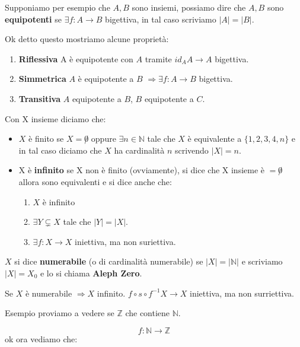 \documentclass{article}
\theoremstyle{definition}
\begin{document}
Supponiamo per esempio che $A,B$ sono insiemi, possiamo dire che $A,B$ sono \textbf{equipotenti} se $\exists f:A \rightarrow B$ bigettiva, in tal caso scriviamo $|A| = |B|$. \par

Ok detto questo mostriamo alcune proprietà:
\begin{enumerate}
        \item \textbf{Riflessiva} A è equipotente con $A$ tramite $id_A A \rightarrow A$ bigettiva.
        \item \textbf{Simmetrica} $A$ è equipotente a $B$ $\Rightarrow \exists f:A \rightarrow B$ bigettiva. 
        \item \textbf{Transitiva} $A$ equipotente a $B$, $B$ equipotente a $C$.	
\end{enumerate}

Con X insieme diciamo che:
\begin{itemize}
        \item $X$ è finito se $X = \not 0$ oppure $\exists n \in \mathbb{N}$ tale che $X$ è equivalente a $\{1,2,3,4,n\}$ e in tal caso diciamo che $X$ ha cardinalità $n$ scrivendo $|X| = n$.
        \item X è \textbf{infinito} se X non è finito (ovviamente), si dice che X insieme è $= \not 0$ allora sono equivalenti e si dice anche che:
        \begin{enumerate}
                \item$X$ è infinito
                \item $\exists Y \subsetneq X$ tale che $|Y|=|X|$.
                \item $\exists f:X \to X$ iniettiva, ma non suriettiva.
        \end{enumerate}
\end{itemize}

$X$ si dice \textbf{numerabile} (o di cardinalità numerabile) se $|X| = |\mathbb{N}|$ e scriviamo $|X| = X_0$ e lo si chiama \textbf{Aleph Zero}. \par
Se $X$ è numerabile $\Rightarrow X$ infinito. \newline
$f \circ s \circ f^{-1} X \rightarrow X$ iniettiva, ma non surriettiva.

Esempio proviamo a vedere se $\mathbb{Z}$ che contiene $\mathbb{N}$. \par
\begin{equation}
        f : \mathbb{N} \rightarrow \mathbb{Z}
\end{equation}
ok ora vediamo che: \newline
\end{document}

